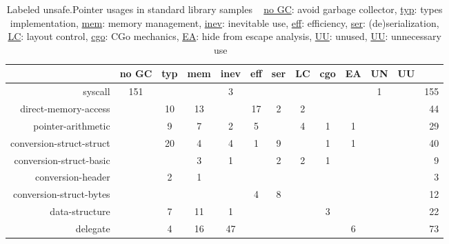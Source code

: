 \begin{table*}[t]
    \centering
    \caption[Labeled unsafe.Pointer usages in standard library samples. Answers \ref{rq:purpose}]%
        {Labeled unsafe.Pointer usages in standard library samples \newline \tiny ~ \newline \small
            \underline{no GC}: avoid garbage collector, \underline{typ}: types implementation,
            \underline{mem}: memory management, \underline{inev}: inevitable use, \underline{eff}: efficiency,
            \underline{ser}: (de)serialization, \underline{LC}: layout control, \underline{cgo}: CGo mechanics,
            \underline{EA}: hide from escape analysis, \underline{UU}: unused, \underline{UU}: unnecessary use \newline \tiny ~}
    \label{tbl:survey-small-results-std}
    \begin{tabular}{r|ccccccccccc|r}
                                          & no GC & typ & mem & inev & eff & ser & LC & cgo & EA & UN & UU &   {} \\ \hline
                                  syscall &   151 &     &     &    3 &     &     &    &     &    &  1 &    &  155 \\
        \rowcolor{verylightgray}
                     direct-memory-access &       &  10 &  13 &      &  17 &   2 &  2 &     &    &    &    &   44 \\
                       pointer-arithmetic &       &   9 &   7 &    2 &   5 &     &  4 &   1 &  1 &    &    &   29 \\
        \rowcolor{verylightgray}
                 conversion-struct-struct &       &  20 &   4 &    4 &   1 &   9 &    &   1 &  1 &    &    &   40 \\
                  conversion-struct-basic &       &     &   3 &    1 &     &   2 &  2 &   1 &    &    &    &    9 \\
        \rowcolor{verylightgray}
                        conversion-header &       &   2 &   1 &      &     &     &    &     &    &    &    &    3 \\
                  conversion-struct-bytes &       &     &     &      &   4 &   8 &    &     &    &    &    &   12 \\
        \rowcolor{verylightgray}
                           data-structure &       &   7 &  11 &    1 &     &     &    &   3 &    &    &    &   22 \\
                                 delegate &       &   4 &  16 &   47 &     &     &    &     &  6 &    &    &   73 \\

\end{tabular}
\end{table*}
